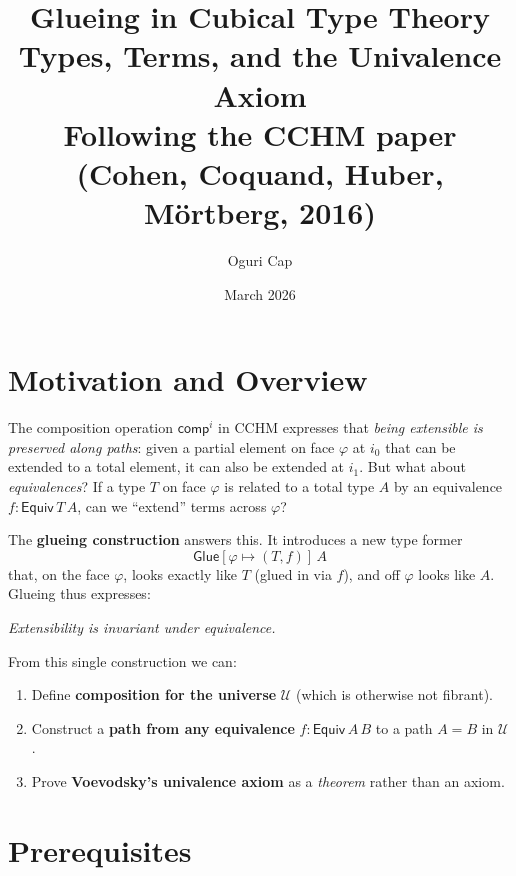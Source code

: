 \documentclass[11pt, a4paper]{article}
\title{%
  \textbf{Glueing in Cubical Type Theory}\\[6pt]
  \large Types, Terms, and the Univalence Axiom\\[4pt]
  \normalsize Following the CCHM paper (Cohen, Coquand, Huber, M\"ortberg, 2016)
}
\author{Oguri Cap}
\date{March 2026}
\newcommand{\UU}{\mathcal{U}}
\newcommand{\pt}[1]{\mathsf{#1}}
\newcommand{\GlueT}{\pt{Glue}}
\newcommand{\compT}{\pt{comp}}
\newcommand{\EquivT}{\pt{Equiv}}
\newcommand{\sys}[2]{[#1 \mapsto #2]}
\newcommand{\io}{i_0}
\newcommand{\ii}{i_1}
\begin{document}
\maketitle
\tableofcontents
\vspace{1em}

\section{Motivation and Overview}

The composition operation $\compT^i$ in CCHM expresses that
\emph{being extensible is preserved along paths}: given a partial element on
face $\varphi$ at $\io$ that can be extended to a total element, it can also
be extended at $\ii$. But what about \emph{equivalences}? If a type $T$ on
face $\varphi$ is related to a total type $A$ by an equivalence $f :
\EquivT\, T\, A$, can we ``extend'' terms across $\varphi$?

\medskip
The \textbf{glueing construction} answers this. It introduces a new type
former
\[
  \GlueT\sys{\varphi}{(T,f)}\,A
\]
that, on the face $\varphi$, looks exactly like $T$ (glued in via $f$), and
off $\varphi$ looks like $A$. Glueing thus expresses:
\begin{center}
  \emph{Extensibility is invariant under equivalence.}
\end{center}

From this single construction we can:
\begin{enumerate}[label=\textbf{(\arabic*)}]
  \item Define \textbf{composition for the universe} $\UU$ (which is
        otherwise not fibrant).
  \item Construct a \textbf{path from any equivalence}
        $f : \EquivT\, A\, B$ to a path $A = B$ in $\UU$.
  \item Prove \textbf{Voevodsky's univalence axiom} as a
        \emph{theorem} rather than an axiom.
\end{enumerate}

\section{Prerequisites}
\end{document}
